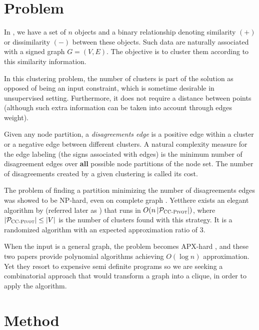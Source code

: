 \section{Problem}

In \pcc{}, we have a set of $n$ objects and a binary relationship denoting
similarity $(+)$  or dissimilarity $(-)$ between these objects. Such data are
naturally associated with a signed graph $G=(V,E)$. The objective is to
cluster them according to this similarity information.

In this clustering problem, the number of clusters is part of the solution as
opposed of being an input constraint, which is sometime desirable in
unsupervised setting. Furthermore, it does not require a distance between
points (although such extra information can be taken into account through
edges weight).

Given any node partition, a \emph{disagreements edge} is a positive edge within a
cluster or a negative edge between different clusters. A natural complexity
measure for the edge labeling (the signs associated with edges) is the minimum
number of disagreement edges over \textbf{all} possible node partitions of the node
set. The number of disagreements created by a given clustering is called its
cost.

\medskip

The problem of finding a partition minimizing the number of disagreements
edges was showed to be NP-hard, even on complete graph \autocite{Bansal2002}.
Yetthere exists an elegant algorithm by \textcite{Ailon2008} (referred
later as \ccp{}) that runs in $O(n\left|\mathcal{P}_{\text{\textsc{CC-Pivot}{}}}\right|)$,
where $\left|\mathcal{P}_{\text{\textsc{CC-Pivot}{}}}\right| \le |V|$ is the number of
clusters found with this strategy. It is a randomized algorithm with an
expected approximation ratio of $3$.

When the input is a general graph, the problem becomes APX-hard
\autocites{Charikar2003}{Demaine2006}, and these two papers provide polynomial
algorithms achieving $O(\log n)$ approximation. Yet they resort to expensive
semi definite programs so we are seeking a combinatorial approach that would
transform a graph into a clique, in order to apply the \ccp{} algorithm.

\section{Method}

